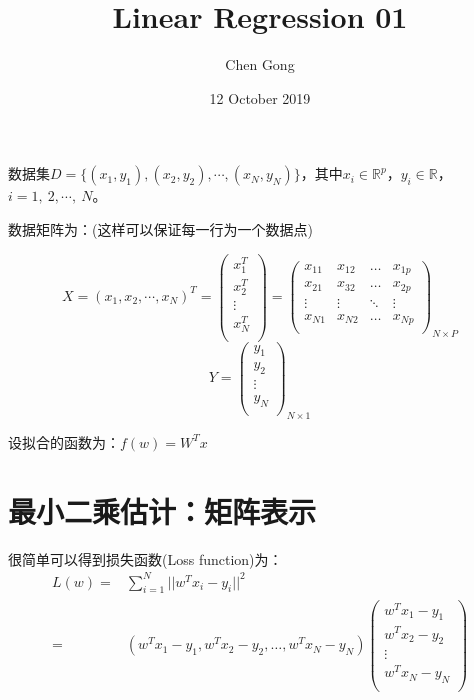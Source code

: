 \documentclass[a4paper]{article}
\title{Linear Regression 01}
\author{Chen Gong}
\date{12 October 2019}
\begin{document}
\maketitle

数据集$D=\{(x_1, y_1), (x_2, y_2), \cdots, (x_N, y_N)\}$，其中$x_i\in\mathbb{R}^{p}$，$y_i\in\mathbb{R}$，$i=1, \ 2,\cdots,\ N$。

数据矩阵为：(这样可以保证每一行为一个数据点)

\begin{equation}
    X=(x_1, x_2, \cdots, x_N)^T=
    \begin{pmatrix}
    x_1^T \\ 
    x_2^T \\
    \vdots\\
    x_N^T \\
    \end{pmatrix} =
    \begin{pmatrix}
    x_{11} & x_{12} & \dots & x_{1p}\\
    x_{21} & x_{32} & \dots & x_{2p}\\
    \vdots & \vdots & \ddots & \vdots\\
    x_{N1} & x_{N2} & \dots & x_{Np}\\
    \end{pmatrix}_{N\times P}
\end{equation}
\begin{equation}
    Y=
    \begin{pmatrix}
    y_1 \\ 
    y_2 \\
    \vdots\\
    y_N \\
    \end{pmatrix}_{N\times 1}
\end{equation}

设拟合的函数为：$f(w)=W^T x$

\section{最小二乘估计：矩阵表示}
很简单可以得到损失函数(Loss function)为：
\begin{align}
     L(w) = & \sum_{i=1}^{N}||w^T x_i-y_i||^2 \\
          = & (w^T x_1-y_1, w^T x_2-y_2, \dots, w^T x_N-y_N)
          \begin{pmatrix}
            w^T x_1-y_1\\
            w^T x_2-y_2\\
            \vdots\\
            w^T x_N-y_N\\
          \end{pmatrix}                      
\end{align}
\end{document}
